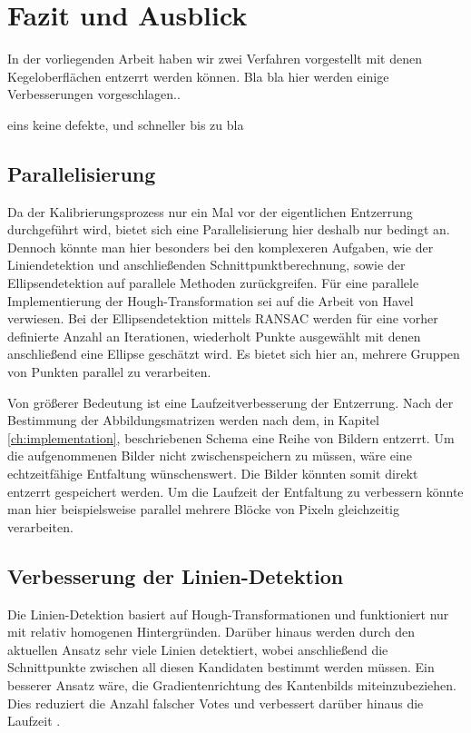 \chapter{Fazit und Ausblick}
\label{ch:summary}

In der vorliegenden Arbeit haben wir zwei Verfahren vorgestellt mit denen Kegeloberflächen entzerrt werden können.
Bla bla hier werden einige Verbesserungen vorgeschlagen..


eins keine defekte, und schneller bis zu bla

\section{Parallelisierung}
Da der Kalibrierungsprozess nur ein Mal vor der eigentlichen Entzerrung durchgeführt wird, bietet sich eine Parallelisierung hier deshalb nur bedingt an.
Dennoch könnte man hier besonders bei den komplexeren Aufgaben, wie der Liniendetektion und anschließenden Schnittpunktberechnung, sowie der Ellipsendetektion auf parallele Methoden zurückgreifen.
Für eine parallele Implementierung der Hough-Transformation sei auf die Arbeit von Havel \cite{Havel2014} verwiesen.
Bei der Ellipsendetektion mittels RANSAC werden für eine vorher definierte Anzahl an Iterationen, wiederholt Punkte ausgewählt mit denen anschließend eine Ellipse geschätzt wird. Es bietet sich hier an, mehrere Gruppen von Punkten parallel zu verarbeiten.

Von größerer Bedeutung ist eine Laufzeitverbesserung der Entzerrung. Nach der Bestimmung der Abbildungsmatrizen werden nach dem, in Kapitel \ref{ch:implementation}, beschriebenen Schema eine Reihe von Bildern entzerrt. Um die aufgenommenen Bilder nicht zwischenspeichern zu müssen, wäre eine echtzeitfähige Entfaltung wünschenswert. Die Bilder könnten somit direkt entzerrt gespeichert werden.  Um die Laufzeit der Entfaltung zu verbessern könnte man hier beispielsweise parallel mehrere Blöcke von Pixeln gleichzeitig verarbeiten.


\section{Verbesserung der Linien-Detektion}
Die Linien-Detektion basiert auf Hough-Transformationen und funktioniert nur mit relativ homogenen Hintergründen. Darüber hinaus werden durch den aktuellen Ansatz sehr viele Linien detektiert, wobei anschließend die Schnittpunkte zwischen all diesen Kandidaten bestimmt werden müssen. Ein besserer Ansatz wäre, die Gradientenrichtung des Kantenbilds miteinzubeziehen. Dies reduziert die Anzahl falscher Votes und verbessert darüber hinaus die Laufzeit \cite{Gorman1976}.


